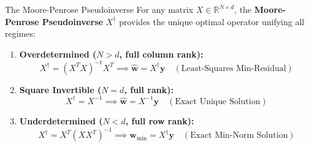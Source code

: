 \begin{definitionbox}{The Moore-Penrose Pseudoinverse}
For any matrix $X \in \mathbb{R}^{N \times d}$, the \textbf{Moore-Penrose Pseudoinverse} $X^\dagger$ provides the unique optimal operator unifying all regimes:
\begin{enumerate}
    \item \textbf{Overdetermined ($N > d$, full column rank):}
    \begin{equation}
    X^\dagger = (X^T X)^{-1} X^T \implies \hat{\mathbf{w}} = X^\dagger \mathbf{y} \quad (\text{Least-Squares Min-Residual})
    \end{equation}
    \item \textbf{Square Invertible ($N = d$, full rank):}
    \begin{equation}
    X^\dagger = X^{-1} \implies \hat{\mathbf{w}} = X^{-1} \mathbf{y} \quad (\text{Exact Unique Solution})
    \end{equation}
    \item \textbf{Underdetermined ($N < d$, full row rank):}
    \begin{equation}
    X^\dagger = X^T (X X^T)^{-1} \implies \mathbf{w}_{\text{min}} = X^\dagger \mathbf{y} \quad (\text{Exact Min-Norm Solution})
    \end{equation}
\end{enumerate}
\end{definitionbox}

